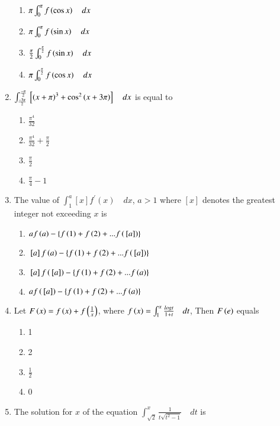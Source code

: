 \documentclass[journal]{IEEEtran}
\begin{document}
\begin{enumerate}
\begin{enumerate}
		         \item $\pi \int_{0}^{\pi} f\left(\cos x\right) \quad dx$
		         \item $\pi \int_{0}^{\pi} f\left(\sin x\right) \quad dx$
		         \item $\frac{\pi}{2} \int_{0}^{\frac{\pi}{2}} f\left(\sin x\right) \quad dx$
		         \item $\pi \int_{0}^{\frac{\pi}{2}} f\left(\cos x\right) \quad dx$
		    \end{enumerate}
	     \item
		    $\int_{\frac{-3\pi}{2}}^{\frac{-\pi}{2}} {}\left[\left(x+\pi\right)^{3}+\cos^{2}\left(x+3\pi\right)\right] \quad dx$ is equal to
		    \hfill {} 
		   \begin{enumerate}
		        \item $\frac{\pi^{4}}{32}$
		        \item $\frac{\pi^{4}}{32}+\frac{\pi}{2}$
		        \item $\frac{\pi}{2}$
		        \item $\frac{\pi}{4}-1$
		   \end{enumerate}
	    \item
		    The value of $\int_{1}^{a} [x]f^{\prime}(x) \quad dx$, $a>1$ where $[x]$ denotes the greatest integer not exceeding $x$ is
		   \hfill {}
		   \begin{enumerate}
		       \item $af\left(a\right)-\left\{f\left(1\right)+f\left(2\right)+...f\left({}\left[a\right]\right)\right\}$
		       \item ${}\left[a\right]f\left(a\right)-\left\{f\left(1\right)+f\left(2\right)+...f\left({}\left[a\right]\right)\right\}$
		       \item ${}\left[a\right]f\left({}\left[a\right]\right)-\left\{f\left(1\right)+f\left(2\right)+...f\left(a\right)\right\}$
		       \item $af\left({}\left[a\right]\right)-\left\{f\left(1\right)+f\left(2\right)+...f\left(a\right)\right\}$
		   \end{enumerate}
	   \item 
		    Let $F\left(x\right)=f\left(x\right)+f\left(\frac{1}{x}\right)$, where $f\left(x\right)=\int_{1}^{x} \frac{logt}{1+t} \quad dt$, Then $F\left(e\right)$ equals
		    \hfill {} 
		   \begin{enumerate}
		      \item 1
		      \item 2
		      \item $\frac{1}{2}$
		      \item 0
		   \end{enumerate}  
	   \item 
    		    The solution for $x$ of the equation $\int_{\sqrt2}^{x} \frac{1}{t\sqrt{t^{2}-1}} \quad dt$ is

\end{enumerate}
\end{document}
